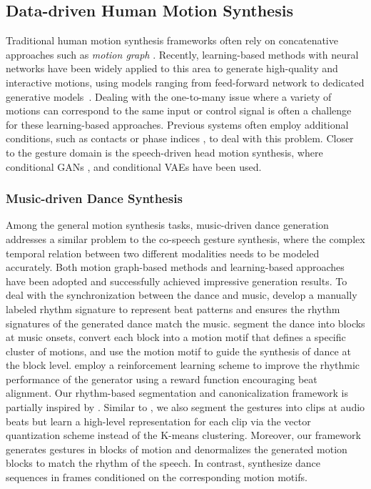 \documentclass[acmtog,authorversion]{acmart}
\begin{document}
\subsection{Data-driven Human Motion Synthesis}
Traditional human motion synthesis frameworks often rely on concatenative approaches such as \emph{motion graph} \cite{Kovar2002_MotionGraphs}. Recently, learning-based methods with neural networks have been widely applied to this area to generate high-quality and interactive motions, using models ranging from feed-forward network \cite{holden2017phase,Starke2022_DeepPhase} to dedicated generative models~\cite{henter2020moglow, Ling2020_MotionVAE}. Dealing with the one-to-many issue where a variety of motions can correspond to the same input or control signal is often a challenge for these learning-based approaches. Previous systems often employ additional conditions, such as contacts \cite{starke2020local} or phase indices \cite{holden2017phase,Starke2022_DeepPhase}, to deal with this problem. Closer to the gesture domain is the speech-driven head motion synthesis, where conditional GANs \cite{sadoughi2018novel}, and conditional VAEs \cite{greenwood2017predicting} have been used.

\subsubsection{Music-driven Dance Synthesis}
Among the general motion synthesis tasks, music-driven dance generation addresses a similar problem to the co-speech gesture synthesis, where the complex temporal relation between two different modalities needs to be modeled accurately. Both motion graph-based methods \cite{kim2006making,chen2021choreomaster} and learning-based approaches \cite{Li_2021_aist,valle2021transflower,li2022bailando} have been adopted and successfully achieved impressive generation results. To deal with the synchronization between the dance and music, \citet{chen2021choreomaster} develop a manually labeled rhythm signature to represent beat patterns and ensures the rhythm signatures of the generated dance match the music. \citet{aristidou2021rhythm} segment the dance into blocks at music onsets, convert each block into a motion motif \cite{aristidou2018deep} that defines a specific cluster of motions, and use the motion motif to guide the synthesis of dance at the block level. \citet{li2022bailando} employ a reinforcement learning scheme to improve the rhythmic performance of the generator using a reward function encouraging beat alignment. Our rhythm-based segmentation and canonicalization framework is partially inspired by \cite{aristidou2021rhythm}. Similar to \cite{aristidou2021rhythm}, we also segment the gestures into clips at audio beats but learn a high-level representation for each clip via the vector quantization scheme \cite{oord2017neural} instead of the K-means clustering. Moreover, our framework generates gestures in blocks of motion and denormalizes the generated motion blocks to match the rhythm of the speech. In contrast, \citet{aristidou2021rhythm} synthesize dance sequences in frames conditioned on the corresponding motion motifs.
\end{document}
